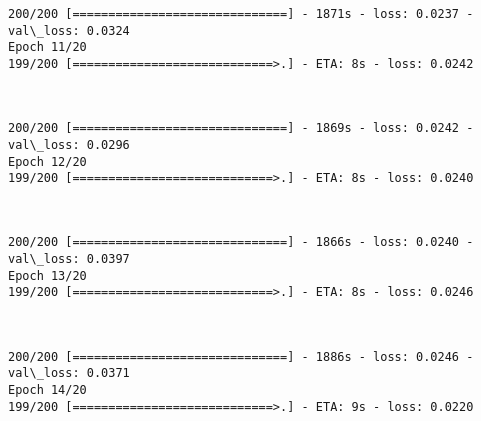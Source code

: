 \documentclass[11pt]{article}
\begin{document}
    \begin{Verbatim}[commandchars=\\\{\}]
200/200 [==============================] - 1871s - loss: 0.0237 - val\_loss: 0.0324
Epoch 11/20
199/200 [============================>.] - ETA: 8s - loss: 0.0242 
    \end{Verbatim}

    \begin{center}
    \end{center}
    { \hspace*{\fill} \\}
    
    \begin{Verbatim}[commandchars=\\\{\}]
200/200 [==============================] - 1869s - loss: 0.0242 - val\_loss: 0.0296
Epoch 12/20
199/200 [============================>.] - ETA: 8s - loss: 0.0240 
    \end{Verbatim}

    \begin{center}
    \end{center}
    { \hspace*{\fill} \\}
    
    \begin{Verbatim}[commandchars=\\\{\}]
200/200 [==============================] - 1866s - loss: 0.0240 - val\_loss: 0.0397
Epoch 13/20
199/200 [============================>.] - ETA: 8s - loss: 0.0246 
    \end{Verbatim}

    \begin{center}
    \end{center}
    { \hspace*{\fill} \\}
    
    \begin{Verbatim}[commandchars=\\\{\}]
200/200 [==============================] - 1886s - loss: 0.0246 - val\_loss: 0.0371
Epoch 14/20
199/200 [============================>.] - ETA: 9s - loss: 0.0220 
    \end{Verbatim}

    \begin{center}
    \end{center}
    { \hspace*{\fill} \\}
    
\end{document}
